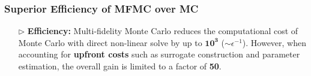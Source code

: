 \documentclass{beamer}
\begin{document}
\begin{frame}[t]
    \frametitle{Superior Efficiency of MFMC over MC}
\begin{itemize}[leftmargin=5pt] 
%

\item[$\triangleright$] \textcolor{myblue3}{\bf Efficiency:} {\footnotesize 
 Multi-fidelity Monte Carlo reduces the computational cost of Monte Carlo with direct non-linear solve by up to  $\boldsymbol{10^3}$ ($\sim \epsilon^{-1}$). However,  when accounting for {\bf upfront costs} such as surrogate construction and parameter estimation, the overall gain is limited to a factor of {\bf 50}.}
 \vspace{3mm}
\begin{figure}[ht!]\centering
{}
\label{fig:Experiment_result_plot}
\end{figure}

\end{itemize}
\end{frame}
\end{document}
